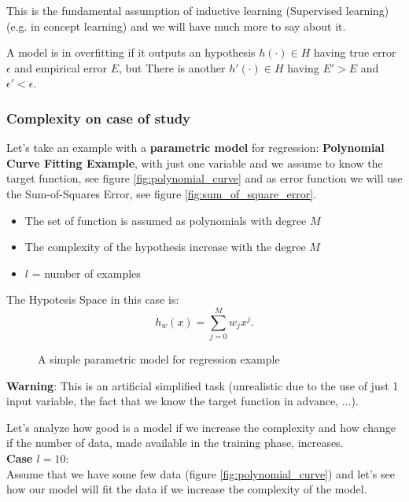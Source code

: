 \documentclass[../main.tex]{subfiles}
\begin{document}
This is the fundamental assumption of inductive learning (Supervised learning) (e.g. in concept learning) and we will have much more to say about it.

\begin{definition}[Overfitting]
A model is in overfitting if it outputs an hypothesis $h(\cdot) \in H$ having true error $\epsilon$ and empirical error $E$, but There is another  $h'(\cdot) \in H$ having $E' > E$ and $\epsilon' < \epsilon$.
\end{definition}

\subsubsection{Complexity on case of study}
Let's take an example with a \textbf{parametric model} for regression: \textbf{Polynomial Curve Fitting Example}, with just one variable and we assume to know the target function, see figure \ref{fig:polynomial_curve} and as error function we will use the Sum-of-Squares Error, see figure \ref{fig:sum_of_square_error}.

\begin{itemize}
    \item The set of function is assumed as polynomials with degree $M$
    \item The complexity of the hypothesis increase with the degree $M$
    \item $l$ = number of examples
\end{itemize}

The Hypotesis Space in this case is:
\[
    h_w(x) = \sum_{j=0}^{M} w_j x^j
.\] 

\begin{figure}[ht]
  \centering
  \hfill
  \caption{A simple parametric model for regression example}
\end{figure}

\textbf{Warning}: This is an artificial simplified task (unrealistic due to the use of just 1 input variable, the fact that we know the target function in advance, ...).

Let's analyze how good is a model if we increase the complexity and how change if the number of data, made available in the training phase, increases.\\
\noindent \textbf{Case $l = 10$}:\\
Assume that we have some few data  (figure \ref{fig:polynomial_curve}) and let's see how our model will fit the data if we increase the complexity of the model.
\end{document}
